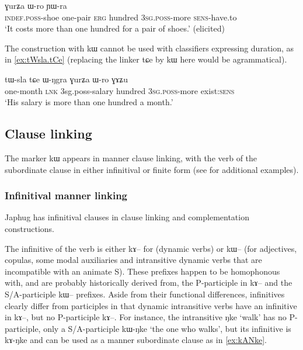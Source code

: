 \documentclass[oldfontcommands,oneside,a4paper,11pt]{article}
\newcommand{\ipa}[1]{{\phon #1}} %
\begin{document}
  \begin{exe} 
\ex \label{ex:tWtCha.kW}
\gll  
[\ipa{tɯ-xtsa} 	\ipa{\textbf{tɯ-tɕʰa}}] 	\ipa{kɯ} 	\ipa{ɣurʑa} 	\ipa{ɯ-ro} 	\ipa{ɲɯ-ra} \\
\textsc{indef.poss}-shoe one-pair \textsc{erg} hundred \textsc{3sg.poss}-more \textsc{sens}-have.to \\
 \glt  `It costs more than one hundred for a pair of shoes.' (elicited)
\end{exe}  
The construction with \ipa{kɯ} cannot be used with classifiers expressing duration, as in \ref{ex:tWsla.tCe} (replacing the linker \ipa{tɕe} by \ipa{kɯ} here would be agrammatical).
 
 \begin{exe} 
\ex \label{ex:tWsla.tCe}
\gll  
  \ipa{tɯ-sla} \ipa{tɕe} \ipa{ɯ-ŋgra} \ipa{ɣurʑa} \ipa{ɯ-ro} \ipa{ɣɤʑu} \\
  one-month \textsc{lnk} 3sg.poss-salary hundred \textsc{3sg.poss}-more exist:\textsc{sens} \\
  \glt `His salary is more than one hundred a month.'
  \end{exe}  
 
  
 \subsection{Clause linking} \label{sec:linking}
 The marker \ipa{kɯ} appears in manner clause linking, with the verb of the subordinate clause in either infinitival or finite form (see \citealt{jacques14linking} for additional examples).
 
 \subsubsection{Infinitival manner linking} \label{sec:manner}
Japhug has infinitival clauses in clause linking and complementation constructions.

The infinitive of the verb is either \ipa{kɤ--} for (dynamic verbs) or \ipa{kɯ--} (for adjectives, copulas, some modal auxiliaries and intransitive dynamic verbs that are incompatible with an animate S). These prefixes happen to be homophonous with, and are probably historically derived from, the P-participle in \ipa{kɤ--} and the S/A-participle \ipa{kɯ--} prefixes. Aside from their functional differences, infinitives clearly differ from participles in that dynamic intransitive verbs have an infinitive in \ipa{kɤ--}, but no P-participle \ipa{kɤ--}. For instance, the intransitive \ipa{ŋke} `walk' has no P-participle, only a S/A-participle \ipa{kɯ-ŋke} `the one who walks', but its infinitive is \ipa{kɤ-ŋke} and can be used as a manner subordinate clause as in \ref{ex:kANke}.
\end{document}
